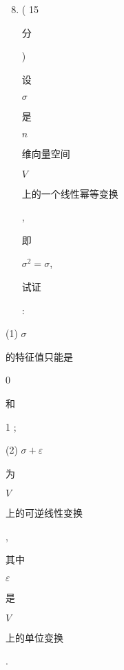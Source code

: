\documentclass[10pt]{article}
\begin{document}
\begin{enumerate}
  \setcounter{enumi}{7}
  \item ( 15 \begin{CJK}{UTF8}{mj}分\end{CJK}) \begin{CJK}{UTF8}{mj}设\end{CJK} $\sigma$ \begin{CJK}{UTF8}{mj}是\end{CJK} $n$ \begin{CJK}{UTF8}{mj}维向量空间\end{CJK} $V$ \begin{CJK}{UTF8}{mj}上的一个线性幂等变换\end{CJK}, \begin{CJK}{UTF8}{mj}即\end{CJK} $\sigma^{2}=\sigma$, \begin{CJK}{UTF8}{mj}试证\end{CJK}:
\end{enumerate}
(1) $\sigma$ \begin{CJK}{UTF8}{mj}的特征值只能是\end{CJK} 0 \begin{CJK}{UTF8}{mj}和\end{CJK} 1 ;

(2) $\sigma+\varepsilon$ \begin{CJK}{UTF8}{mj}为\end{CJK} $V$ \begin{CJK}{UTF8}{mj}上的可逆线性变换\end{CJK}, \begin{CJK}{UTF8}{mj}其中\end{CJK} $\varepsilon$ \begin{CJK}{UTF8}{mj}是\end{CJK} $V$ \begin{CJK}{UTF8}{mj}上的单位变换\end{CJK}.
\end{document}
